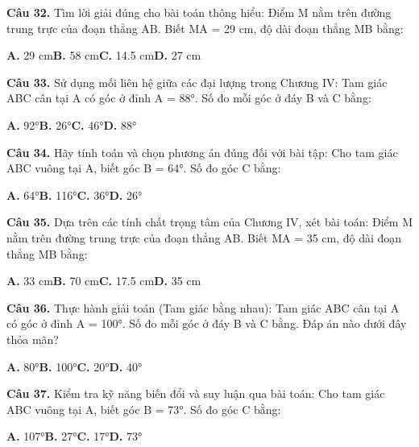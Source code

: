\documentclass[11pt,a4paper]{article}
\begin{document}
\textbf{\color{primary} Câu 32.} Tìm lời giải đúng cho bài toán thông hiểu: Điểm M nằm trên đường trung trực của đoạn thẳng AB. Biết MA = 29 cm, độ dài đoạn thẳng MB bằng:\par
\hspace*{1.5em}\textbf{A.} 29 cm\quad\quad \textbf{B.} 58 cm\quad\quad \textbf{C.} 14.5 cm\quad\quad \textbf{D.} 27 cm\par\vspace{2pt}
\textbf{\color{primary} Câu 33.} Sử dụng mối liên hệ giữa các đại lượng trong Chương IV: Tam giác ABC cân tại A có góc ở đỉnh A = 88°. Số đo mỗi góc ở đáy B và C bằng:\par
\hspace*{1.5em}\textbf{A.} 92°\quad\quad \textbf{B.} 26°\quad\quad \textbf{C.} 46°\quad\quad \textbf{D.} 88°\par\vspace{2pt}
\textbf{\color{primary} Câu 34.} Hãy tính toán và chọn phương án đúng đối với bài tập: Cho tam giác ABC vuông tại A, biết góc B = 64°. Số đo góc C bằng:\par
\hspace*{1.5em}\textbf{A.} 64°\quad\quad \textbf{B.} 116°\quad\quad \textbf{C.} 36°\quad\quad \textbf{D.} 26°\par\vspace{2pt}
\textbf{\color{primary} Câu 35.} Dựa trên các tính chất trọng tâm của Chương IV, xét bài toán: Điểm M nằm trên đường trung trực của đoạn thẳng AB. Biết MA = 35 cm, độ dài đoạn thẳng MB bằng:\par
\hspace*{1.5em}\textbf{A.} 33 cm\quad\quad \textbf{B.} 70 cm\quad\quad \textbf{C.} 17.5 cm\quad\quad \textbf{D.} 35 cm\par\vspace{2pt}
\textbf{\color{primary} Câu 36.} Thực hành giải toán (Tam giác bằng nhau): Tam giác ABC cân tại A có góc ở đỉnh A = 100°. Số đo mỗi góc ở đáy B và C bằng. Đáp án nào dưới đây thỏa mãn?\par
\hspace*{1.5em}\textbf{A.} 80°\quad\quad \textbf{B.} 100°\quad\quad \textbf{C.} 20°\quad\quad \textbf{D.} 40°\par\vspace{2pt}
\textbf{\color{primary} Câu 37.} Kiểm tra kỹ năng biến đổi và suy luận qua bài toán: Cho tam giác ABC vuông tại A, biết góc B = 73°. Số đo góc C bằng:\par
\hspace*{1.5em}\textbf{A.} 107°\quad\quad \textbf{B.} 27°\quad\quad \textbf{C.} 17°\quad\quad \textbf{D.} 73°\par\vspace{2pt}
\end{document}
